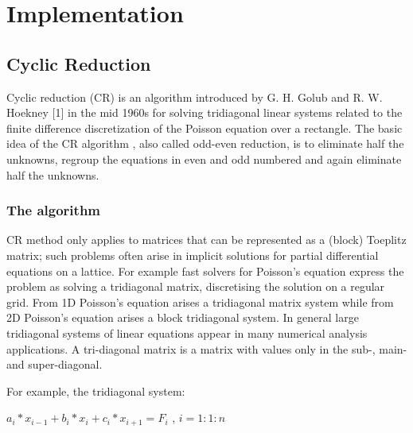 \chapter{Implementation}

\section{Cyclic Reduction}


Cyclic reduction (CR) is an algorithm introduced by G. H. Golub and R. W. Hoekney [1] in the mid 1960s for solving tridiagonal linear systems related to the finite difference discretization of the Poisson equation over a rectangle. 
The basic idea of the CR algorithm , also called odd-even reduction, is to eliminate half the unknowns, regroup the equations in even and odd numbered and again eliminate half the unknowns.


\subsection{The algorithm}

CR method only applies to matrices that can be represented as a (block) Toeplitz matrix; such problems often arise in implicit solutions for partial differential equations on a lattice. For example fast solvers for Poisson's equation express the problem as solving a tridiagonal matrix, discretising the solution on a regular grid. From 1D Poisson’s equation arises a tridiagonal matrix system while from 2D Poisson’s equation arises a block tridiagonal system.
In general large tridiagonal systems of linear equations appear in many numerical analysis applications. A tri-diagonal matrix is a matrix with values only in the sub-, main- and super-diagonal.

For example, the tridiagonal system:

$a_i*x_{i-1} + b_i*x_i+c_i*x_{i+1} = F_{i}$  , \hspace*{2cm} $ i=1:1:n$

